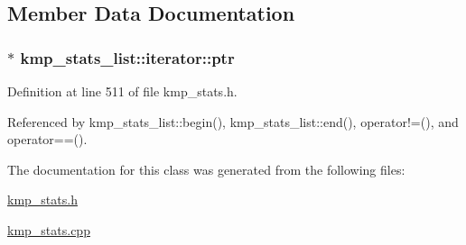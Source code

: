 \subsection{Member Data Documentation}
\hypertarget{classkmp__stats__list_1_1iterator_a76c05db4d69baea9de51370a7e0b0de9}{
\subsubsection[{ptr}]{$\ast$ kmp\-\_\-stats\-\_\-list\-::iterator\-::ptr\hspace{0.3cm}{\ttfamily [private]}}}\label{classkmp__stats__list_1_1iterator_a76c05db4d69baea9de51370a7e0b0de9}


Definition at line 511 of file kmp\-\_\-stats.\-h.



Referenced by kmp\-\_\-stats\-\_\-list\-::begin(), kmp\-\_\-stats\-\_\-list\-::end(), operator!=(), and operator==().



The documentation for this class was generated from the following files\-:\begin{DoxyCompactItemize}
\item 
\hyperlink{kmp__stats_8h}{kmp\-\_\-stats.\-h}\item 
\hyperlink{kmp__stats_8cpp}{kmp\-\_\-stats.\-cpp}\end{DoxyCompactItemize}
